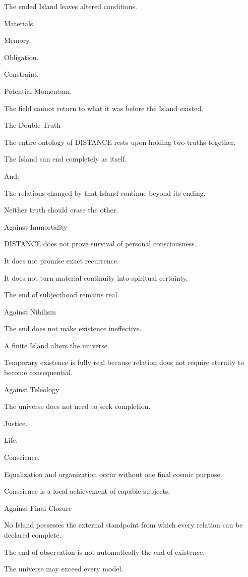 The ended Island leaves altered conditions.

Materials.

Memory.

Obligation.

Constraint.

Potential Momentum.

The field cannot return to what it was before the Island existed.

The Double Truth

The entire ontology of DISTANCE rests upon holding two truths together.

The Island can end completely as itself.

And:

The relations changed by that Island continue beyond its ending.

Neither truth should erase the other.

Against Immortality

DISTANCE does not prove survival of personal consciousness.

It does not promise exact recurrence.

It does not turn material continuity into spiritual certainty.

The end of subjecthood remains real.

Against Nihilism

The end does not make existence ineffective.

A finite Island alters the universe.

Temporary existence is fully real because relation does not require eternity to become consequential.

Against Teleology

The universe does not need to seek completion.

Justice.

Life.

Conscience.

Equalization and organization occur without one final cosmic purpose.

Conscience is a local achievement of capable subjects.

Against Final Closure

No Island possesses the external standpoint from which every relation can be declared complete.

The end of observation is not automatically the end of existence.

The universe may exceed every model.


